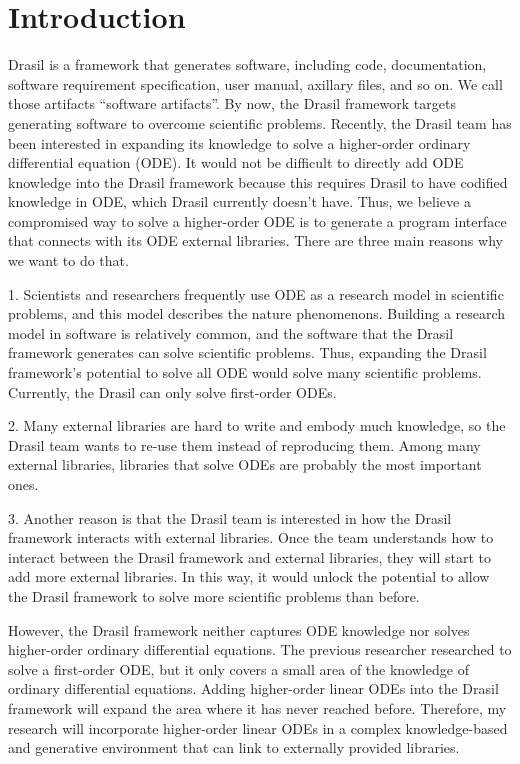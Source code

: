 \chapter{Introduction}
Drasil is a framework that generates software, including code, documentation, software requirement specification, user manual, axillary files, and so on. We call those artifacts ``software artifacts''. By now, the Drasil framework targets generating software to overcome scientific problems. Recently, the Drasil team has been interested in expanding its knowledge to solve a higher-order ordinary differential equation (ODE). It would not be difficult to directly add ODE knowledge into the Drasil framework because this requires Drasil to have codified knowledge in ODE, which Drasil currently doesn't have. Thus, we believe a compromised way to solve a higher-order ODE is to generate a program interface that connects with its ODE external libraries. There are three main reasons why we want to do that.

1. Scientists and researchers frequently use ODE as a research model in scientific problems, and this model describes the nature phenomenons. Building a research model in software is relatively common, and the software that the Drasil framework generates can solve scientific problems. Thus, expanding the Drasil framework's potential to solve all ODE would solve many scientific problems. Currently, the Drasil can only solve first-order ODEs.

2. Many external libraries are hard to write and embody much knowledge, so the Drasil team wants to re-use them instead of reproducing them. Among many external libraries, libraries that solve ODEs are probably the most important ones. 

3. Another reason is that the Drasil team is interested in how the Drasil framework interacts with external libraries. Once the team understands how to interact between the Drasil framework and external libraries, they will start to add more external libraries. In this way, it would unlock the potential to allow the Drasil framework to solve more scientific problems than before. 

However, the Drasil framework neither captures ODE knowledge nor solves higher-order ordinary differential equations. The previous researcher researched to solve a first-order ODE, but it only covers a small area of the knowledge of ordinary differential equations. Adding higher-order linear ODEs into the Drasil framework will expand the area where it has never reached before. Therefore, my research will incorporate higher-order linear ODEs in a complex knowledge-based and generative environment that can link to externally provided libraries.


